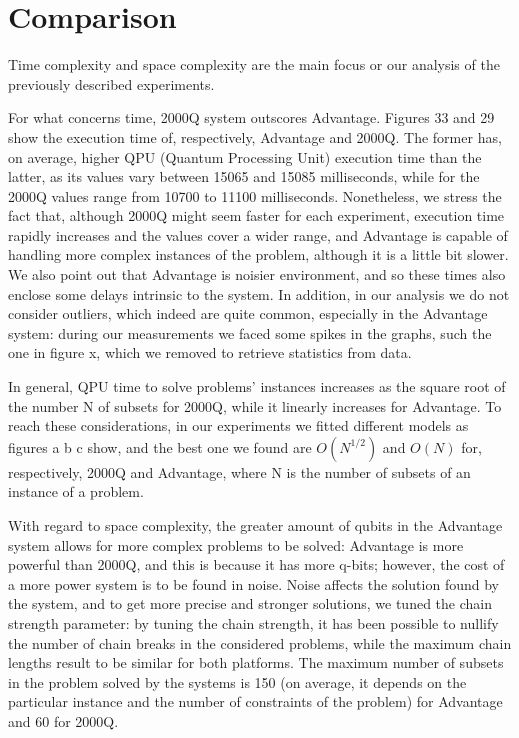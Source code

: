 \documentclass[oneside,a4paper]{article}
\begin{document}
\section{Comparison}

Time complexity and space complexity are the main focus or our analysis of the previously described experiments. 


For what concerns time, 2000Q system outscores Advantage. Figures 33 and 29 show the execution time of, respectively, Advantage and 2000Q. The former has, on average, higher QPU (Quantum Processing Unit) execution time than the latter, as its values vary between 15065 and 15085 milliseconds, while for the 2000Q values range from 10700 to 11100 milliseconds. Nonetheless, we stress the fact that, although 2000Q might seem faster for each experiment, execution time rapidly increases and the values cover a wider range, and Advantage is capable of handling more complex instances of the problem, although it is a little bit slower. We also point out that Advantage is noisier environment, and so these times also enclose some delays intrinsic to the system. In addition, in our analysis we do not consider outliers, which indeed are quite common, especially in the Advantage system: during our measurements we faced some spikes in the graphs, such the one in figure x, which we removed to retrieve statistics from data.

In general, QPU time to solve problems’ instances increases as the square root of the number N of subsets for 2000Q, while it linearly increases for Advantage. To reach these considerations, in our experiments we fitted different models as figures a b c show, and the best one we found are
${O(N^{1/2})}$ and ${O(N)}$ for, respectively, 2000Q and Advantage, where N is the number of subsets of an instance of a problem.

With regard to space complexity, the greater amount of qubits in the Advantage system allows for more complex problems to be solved: Advantage is more powerful than 2000Q, and this is because it has more q-bits; however, the cost of a more power system is to be found in noise. Noise affects the solution found by the system, and to get more precise and stronger solutions, we tuned the chain strength parameter: by tuning the chain strength, it has been possible to nullify the number of chain breaks in the considered problems, while the maximum chain lengths result to be similar for both platforms. The maximum number of subsets in the problem solved by the systems is 150 (on average, it depends on the particular instance and the number of constraints of the problem) for Advantage and 60 for 2000Q.
\end{document}

